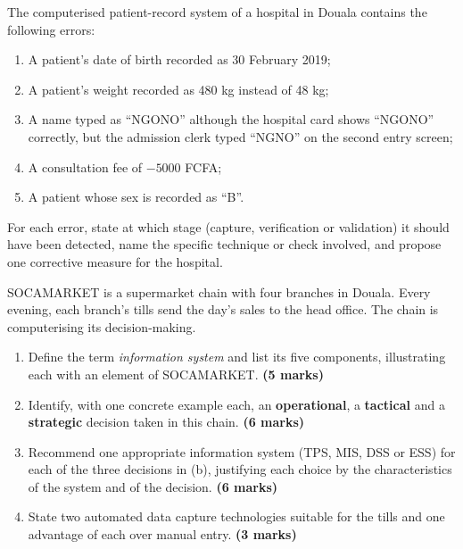 \documentclass[11pt]{article}
\newcommand{\cle}[1]{{\popxbold\color{popdark}#1}}
\newcounter{popsec}
\newcounter{popsub}
\newcommand{\courssub}[1]{%
  \stepcounter{popsub}%
  \par\vspace{9pt}\noindent{\popxbold\fontsize{11.5}{13}\selectfont\color{popink}{\color{poporange}\thepopsec.\thepopsub}\hspace{6pt}#1}\par\nopagebreak\vspace{4pt}
}
\begin{document}
\begin{exercice}
The computerised patient-record system of a hospital in Douala contains the following errors:
\begin{enumerate}
\item A patient's date of birth recorded as 30 February 2019;
\item A patient's weight recorded as 480 kg instead of 48 kg;
\item A name typed as ``NGONO'' although the hospital card shows ``NGONO'' correctly, but the admission clerk typed ``NGNO'' on the second entry screen;
\item A consultation fee of $-5000$ FCFA;
\item A patient whose sex is recorded as ``B''.
\end{enumerate}
For each error, state at which stage (\cle{capture}, \cle{verification} or \cle{validation}) it should have been detected, name the specific technique or check involved, and propose one corrective measure for the hospital.
\end{exercice}

\courssub{I prepare for the GCE}

\begin{exercice}
SOCAMARKET is a supermarket chain with four branches in Douala. Every evening, each branch's tills send the day's sales to the head office. The chain is computerising its decision-making.
\begin{enumerate}
\item Define the term \emph{information system} and list its five components, illustrating each with an element of SOCAMARKET. \textbf{(5 marks)}
\item Identify, with one concrete example each, an \textbf{operational}, a \textbf{tactical} and a \textbf{strategic} decision taken in this chain. \textbf{(6 marks)}
\item Recommend one appropriate information system (TPS, MIS, DSS or ESS) for each of the three decisions in (b), justifying each choice by the characteristics of the system and of the decision. \textbf{(6 marks)}
\item State two automated data capture technologies suitable for the tills and one advantage of each over manual entry. \textbf{(3 marks)}
\end{enumerate}
\end{exercice}
\end{document}

